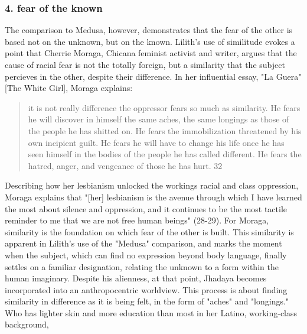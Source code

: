 \documentclass[11pt]{article}
\begin{document}
\subsubsection{4. fear of the known}
\label{sec:org4b192df}
The comparison to Medusa, however, demonstrates that the fear of the
other is based not on the unknown, but on the known. Lilith's use of
similitude evokes a point that Cherrie Moraga, Chicana feminist
activist and writer, argues that the cause of racial fear is not the
totally foreign, but a similarity that the subject percieves in the
other, despite their difference. In her influential essay, "La Guera"
[The White Girl], Moraga explains:
\begin{quote}
it is not really difference the oppressor fears so much as
similarity. He fears he will discover in himself the same aches, the
same longings as those of the people he has shitted on. He fears the
immobilization threatened by his own incipient guilt. He fears he will
have to change his life once he has seen himself in the bodies of the
people he has called different. He fears the hatred, anger, and
vengeance of those he has hurt. 32
\end{quote}
Describing how her lesbianism unlocked the workings racial and class
oppression, Moraga explains that "[her] lesbianism is the avenue
through which I have learned the most about silence and oppression,
and it continues to be the most tactile reminder to me that we are not
free human beings" (28-29). For Moraga, similarity is the foundation
on which fear of the other is built. This similarity is apparent in
Lilith's use of the "Medusa" comparison, and marks the moment when the
subject, which can find no expression beyond body language, finally
settles on a familiar designation, relating the unknown to a form
within the human imaginary. Despite his alienness, at that point,
Jhadaya becomes incorporated into an anthropocentric worldview. This
process is about finding similarity in difference as it is being felt,
in the form of "aches" and "longings." Who has lighter skin and more
education than most in her Latino, working-class background,
\end{document}
